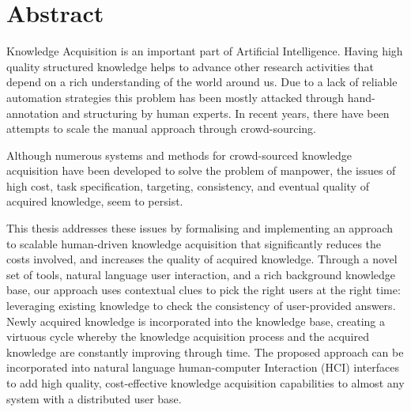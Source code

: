 % 
\chapter*{Abstract}




Knowledge Acquisition is an important part of Artificial Intelligence. Having high quality structured knowledge helps to advance other research activities that depend on a rich understanding of the world around us. Due to a lack of reliable automation strategies this problem has been mostly attacked through hand-annotation and structuring by human experts. In recent years, there have been attempts to scale the manual approach through crowd-sourcing.

Although numerous systems and methods for crowd-sourced knowledge acquisition have been developed to solve the problem of manpower, the issues of high cost, task specification, targeting, consistency, and eventual quality of acquired knowledge, seem to persist.

This thesis addresses these issues by formalising and implementing an approach to scalable human-driven knowledge acquisition that significantly reduces the costs involved, and increases the quality of acquired knowledge. Through a novel set of tools, natural language user interaction, and a rich background knowledge base, our approach uses contextual clues to pick the right users at the right time: leveraging existing knowledge to check the consistency of user-provided answers. Newly acquired knowledge is incorporated into the knowledge base, creating a virtuous cycle whereby the knowledge acquisition process and the acquired knowledge are constantly improving through time. The proposed approach can be incorporated into natural language human-computer Interaction (HCI) interfaces to add high quality, cost-effective knowledge acquisition capabilities to almost any system with a distributed user base.

